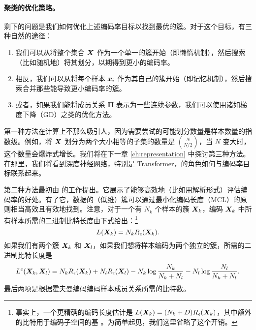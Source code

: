 \documentclass[../../book-main.tex]{subfiles}
\begin{document}
\paragraph{聚类的优化策略。}
剩下的问题是我们如何优化上述编码率目标以找到最优的簇。对于这个目标，有三种自然的途径：
\begin{enumerate}
	\item 我们可以从将整个集合 $\bm{X}$ 作为一个单一的簇开始（即懒惰机制），然后搜索（比如随机地）将其划分，以期得到更小的编码率。
	\item 相反，我们可以从将每个样本 $\bm{x}_i$ 作为其自己的簇开始（即记忆机制），然后搜索合并那些能导致更小编码率的簇。
	\item 或者，如果我们能将成员关系 $\boldsymbol{\Pi}$ 表示为一些连续参数，我们可以使用诸如梯度下降（GD）之类的优化方法。
\end{enumerate}
第一种方法在计算上不那么吸引人，因为需要尝试的可能划分数量是样本数量的指数级。例如，将 $\bm{X}$ 划分为两个大小相等的子集的数量是 $N \choose N/2$，当 $N$ 变大时，这个数量会爆炸式增长。我们将在下一章 \ref{ch:representation} 中探讨第三种方法。在那里，我们将看到深度神经网络，特别是 Transformer，的角色如何与编码率目标联系起来。



第二种方法最初由 \cite{ma2007segmentation} 的工作提出。它展示了能够高效地（比如用解析形式）评估编码率的好处。有了它，数据的（低维）簇可以通过最小化编码长度（MCL）的原则相当高效且有效地找到。注意，对于一个有 $N_k$ 个样本的簇 $\bm{X}_k$，编码 $\bm{X}_k$ 中所有样本所需的二进制比特长度由下式给出：\footnote{事实上，一个更精确的编码长度估计是 $L(\bm{X}_k) = (N_k+D) R_\epsilon(\bm{X}_k)$，其中额外的比特用于编码子空间的基 \cite{ma2007segmentation}。为简单起见，我们这里省略了这个开销。}
\begin{equation}
	L(\bm{X}_k) = N_k R_\epsilon(\bm{X}_k).
\end{equation}
如果我们有两个簇 $\bm{X}_k$ 和 $\bm{X}_l$，如果我们想将样本编码为两个独立的簇，所需的二进制比特长度是
\begin{equation*}
	L^c(\bm{X}_k, \bm{X}_l) = N_k R_\epsilon(\bm{X}_k) + N_l R_\epsilon(\bm{X}_l) - N_k \log\frac{N_k}{N_k + N_l} - N_l \log\frac{N_l}{N_k + N_l}.
\end{equation*}
最后两项是根据霍夫曼编码编码样本成员关系所需的比特数。
\end{document}
